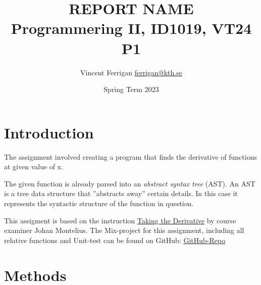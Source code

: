 \documentclass[a4paper,11pt]{article}
\begin{document}
\title{
    REPORT NAME
\\\small{Programmering II, ID1019, VT24 P1}
}
\author{Vincent Ferrigan \href{mailto:ferrigan@kth.se}{ferrigan@kth.se}}

\date{Spring Term 2023}

\maketitle

\section*{Introduction}
\label{sec:introduction}
The assignment involved creating a program that finds the derivative of functions at
given value of x.

The given function is already parsed into an \emph{abstract syntax tree} (AST).
An AST is a tree data structure that ''abstracts away'' certain details.
In this case it represents the syntactic structure of the function in question.

This assigment is based on the instruction
\href{https://people.kth.se/~johanmon/courses/id1020/seminars/derivative/derivative.pdfl}{Taking the Derivative}
by course examiner Johan Montelius.
The Mix-project for this assignment, including all relative functions and Unit-test can be found on GitHub:
\href{https://github.com/VincentFerrigan/kth-id1019-programming-ii/tree/main/tasks/1/derivative}{GitHub-Repo}




\section*{Methods}
\label{sec:methods}
\end{document}
